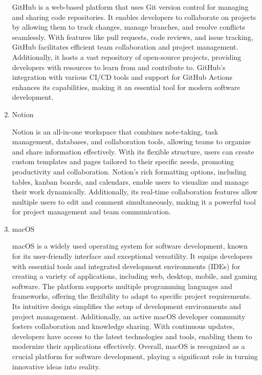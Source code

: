 \documentclass[conference]{IEEEtran}
\begin{document}
\begin{enumerate}[itemsep=2ex, parsep=1ex]
	      	      
	      GitHub is a web-based platform that uses Git version control for managing and sharing code repositories. It enables developers to collaborate on projects by allowing them to track changes, manage branches, and resolve conflicts seamlessly. With features like pull requests, code reviews, and issue tracking, GitHub facilitates efficient team collaboration and project management. Additionally, it hosts a vast repository of open-source projects, providing developers with resources to learn from and contribute to. GitHub's integration with various CI/CD tools and support for GitHub Actions enhances its capabilities, making it an essential tool for modern software development.
	      	      
	\item Notion
	      	      
	      	      
	      Notion is an all-in-one workspace that combines note-taking, task management, databases, and collaboration tools, allowing teams to organize and share information effectively. With its flexible structure, users can create custom templates and pages tailored to their specific needs, promoting productivity and collaboration. Notion's rich formatting options, including tables, kanban boards, and calendars, enable users to visualize and manage their work dynamically. Additionally, its real-time collaboration features allow multiple users to edit and comment simultaneously, making it a powerful tool for project management and team communication.
	      	      
	\item macOS
	      	      
	      macOS is a widely used operating system for software development, known for its user-friendly interface and exceptional versatility. It equips developers with essential tools and integrated development environments (IDEs) for creating a variety of applications, including web, desktop, mobile, and gaming software. The platform supports multiple programming languages and frameworks, offering the flexibility to adapt to specific project requirements. Its intuitive design simplifies the setup of development environments and project management. Additionally, an active macOS developer community fosters collaboration and knowledge sharing. With continuous updates, developers have access to the latest technologies and tools, enabling them to modernize their applications effectively. Overall, macOS is recognized as a crucial platform for software development, playing a significant role in turning innovative ideas into reality.
	      	      
	      	      
\end{enumerate}
\end{document}
